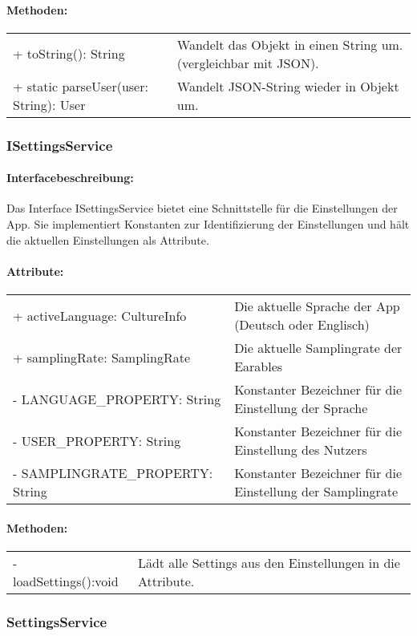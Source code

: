 \documentclass[a4paper,12pt]{article}
\begin{document}
    \paragraph{Methoden:}
    \begin{tabular}{p{7cm}p{10cm}}
        + toString(): String & Wandelt das Objekt in einen String um. (vergleichbar mit JSON).\\
        + static parseUser(user: String): User & Wandelt JSON-String wieder in Objekt um.\\
    \end{tabular}
\subsubsection{ISettingsService}
	\paragraph{Interfacebeschreibung:}
	Das Interface ISettingsService bietet eine Schnittstelle für die Einstellungen der App. Sie implementiert Konstanten zur Identifizierung der Einstellungen und hält die aktuellen Einstellungen als Attribute.
	\paragraph{Attribute:}
	\begin{tabular}{p{7cm}p{10cm}}
		+ activeLanguage: CultureInfo & Die aktuelle Sprache der App (Deutsch oder Englisch)\\
		+ samplingRate: SamplingRate & Die aktuelle Samplingrate der \Gls{Earables} \\ 
		- LANGUAGE\_PROPERTY: String & Konstanter Bezeichner für die Einstellung der Sprache \\
		- USER\_PROPERTY: String & Konstanter Bezeichner für die Einstellung des Nutzers \\
		- SAMPLINGRATE\_PROPERTY: String & Konstanter Bezeichner für die Einstellung der Samplingrate \\
	\end{tabular}
	\paragraph{Methoden:}
	\begin{tabular}{p{7cm}p{10cm}}
		- loadSettings():void & Lädt alle Settings aus den Einstellungen in die Attribute.	
	\end{tabular}
\subsubsection{SettingsService}
\end{document}
